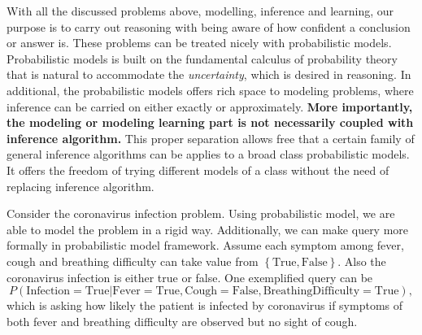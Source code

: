 With all the discussed problems above, modelling, inference and learning, our purpose is to carry out reasoning with being aware of how confident a conclusion or answer is. 
These problems can be treated nicely with probabilistic models. Probabilistic models is built on the fundamental calculus of probability theory that is natural to accommodate the \textit{uncertainty}, which is desired in reasoning. In additional, the probabilistic models offers rich space to modeling problems, where inference can be carried on either exactly or approximately. \textbf{More importantly, the modeling or modeling learning part is not necessarily coupled with inference algorithm.} This proper separation allows free that a certain family of general inference algorithms can be applies to a broad class probabilistic models. It offers the freedom of trying different models of a class without the need of replacing inference algorithm. 

\begin{example}\label{example-corona}
  Consider the coronavirus infection problem. Using probabilistic model, we are able to model the problem in a rigid way. Additionally, we can make query more formally in probabilistic model framework. Assume each symptom among fever, cough and breathing difficulty can take value from $\left\{ \mathrm{True}, \mathrm{False} \right\}$. Also the coronavirus infection is either true or false. One exemplified query can be
  \begin{equation}
    P(\mathrm{Infection} = \mathrm{True} | \mathrm{Fever} = \mathrm{True}, \mathrm{Cough} = \mathrm{False}, \mathrm{Breathing Difficulty}= \mathrm{True}), \nonumber
  \end{equation}
  which is asking how likely the patient is infected by coronavirus if symptoms of both fever and breathing difficulty are observed but no sight of cough.

\end{example}

